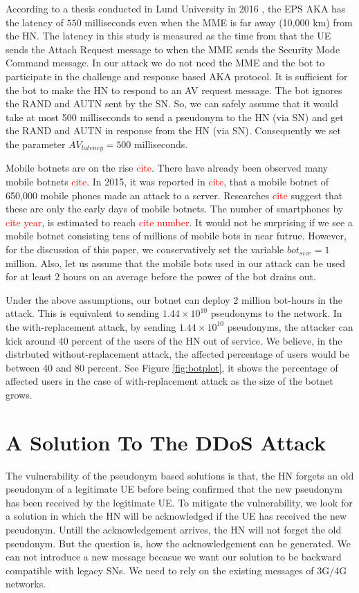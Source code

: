 \documentclass{llncs} %
\begin{document}
According to a thesis conducted in Lund University in 2016 \cite{thesislund}, the EPS AKA has the latency of $550$ milliseconds even when the MME is far away (10,000 km) from the HN. The latency in this study is measured as the time from that the UE sends the Attach Request message to when the MME sends the Security Mode Command message. In our attack we do not need the MME and the bot to participate in the challenge and response based AKA protocol. It is sufficient for the bot to make the HN to respond to an AV request message. The bot ignores the RAND and AUTN sent by the SN. So, we can safely assume that it would take at most 500 milliseconds to send a pseudonym to the HN (via SN) and get the RAND and AUTN in response from the HN (via SN). Consequently we set the parameter $AV_{latency} = 500$ milliseconds.

Mobile botnets are on the rise \textcolor{red}{cite}. There have already been observed many mobile botnets \textcolor{red}{cite}. In 2015, it was reported in \textcolor{red}{cite}, that a mobile botnet of 650,000 mobile phones made an attack to a server. Researches \textcolor{red}{cite} suggest that these are only the early days of mobile botnets. The number of smartphones by \textcolor{red}{cite year}, is estimated to reach \textcolor{red}{cite number}. It would not be surprising if we see a mobile botnet consisting tens of millions of mobile bots in near futrue. However, for the discussion of this paper, we conservatively set the variable $bot_{size} = 1$ million. Also, let us assume that the mobile bots used in our attack can be used for at least $2$ hours on an average before the power of the bot drains out. 

Under the above assumptions, our botnet can deploy $2$ million bot-hours in the attack. This is equivalent to sending $1.44 \times 10^{10}$ pseudonyms to the network. In the with-replacement attack, by sending $1.44 \times 10^{10}$ pseudonyms, the attacker can kick around 40 percent of the users of the HN out of service. We believe, in the distrbuted without-replacement attack, the affected percentage of users would be between 40 and 80 percent. See Figure \ref{fig:botplot}, it shows the percentage of affected users in the case of with-replacement attack as the size of the botnet grows.


\section{A Solution To The DDoS Attack}
The vulnerability of the pseudonym based solutions is that, the HN forgets an old pseudonym of a legitimate UE before being confirmed that the new pseudonym has been received by the legitimate UE. To mitigate the vulnerability, we look for a solution in which the HN will be acknowledged if the UE has received the new pseudonym. Untill the acknowledgement arrives, the HN will not forget the old pseudonym. But the question is, how the acknowledgement can be generated. We can not introduce a new message becasue we want our solution to be backward compatible with legacy SNs. We need to rely on the existing messages of 3G/4G networks. 
\end{document}
